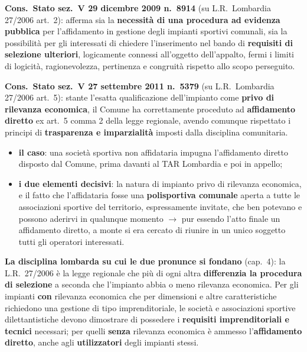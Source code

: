 
\textbf{Cons.\ Stato sez.\ V 29 dicembre 2009 n.\ 8914} (su L.R.\ Lombardia 27/2006 art.\ 2):
afferma sia la \textbf{necessità di una procedura ad evidenza pubblica} per l'affidamento in
gestione degli impianti sportivi comunali, sia la possibilità per gli interessati di chiedere
l'inserimento nel bando di \textbf{requisiti di selezione ulteriori}, logicamente connessi
all'oggetto dell'appalto, fermi i limiti di logicità, ragionevolezza, pertinenza e congruità
rispetto allo scopo perseguito.


\textbf{Cons.\ Stato sez.\ V 27 settembre 2011 n.\ 5379} (su L.R.\ Lombardia 27/2006 art.\ 5):
stante l'esatta qualificazione dell'impianto come \textbf{privo di rilevanza economica}, il Comune
ha correttamente proceduto ad \textbf{affidamento diretto} ex art.\ 5 comma 2 della legge
regionale, avendo comunque rispettato i principi di \textbf{trasparenza e imparzialità} imposti
dalla disciplina comunitaria.

\begin{itemize}
  \item \textbf{il caso}: una società sportiva non affidataria impugna l'affidamento diretto
    disposto dal Comune, prima davanti al TAR Lombardia e poi in appello;
  \item \textbf{i due elementi decisivi}: la natura di impianto privo di rilevanza economica, e il
    fatto che l'affidataria fosse una \textbf{polisportiva comunale} aperta a tutte le
    associazioni sportive del territorio, espressamente invitate, che ben potevano e possono
    aderirvi in qualunque momento $\rightarrow$ pur essendo l'atto finale un affidamento diretto,
    a monte si era cercato di riunire in un unico soggetto tutti gli operatori interessati.
\end{itemize}

\textbf{La disciplina lombarda su cui le due pronunce si fondano} (cap.~4): la L.R.\ 27/2006 è la
legge regionale che più di ogni altra \textbf{differenzia la procedura di selezione} a seconda che
l'impianto abbia o meno rilevanza economica. Per gli impianti \textbf{con} rilevanza economica che
per dimensioni e altre caratteristiche richiedono una gestione di tipo imprenditoriale, le società
e associazioni sportive dilettantistiche devono dimostrare di possedere i \textbf{requisiti
imprenditoriali e tecnici} necessari; per quelli \textbf{senza} rilevanza economica è ammesso
l'\textbf{affidamento diretto}, anche agli \textbf{utilizzatori} degli impianti stessi.

